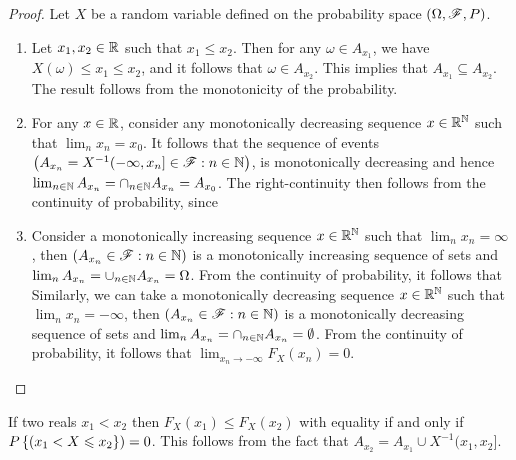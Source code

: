 \documentclass[letterpaper,10pt,english]{article}
\begin{document}
\begin{proof}
Let $X$ be a random variable defined on the probability space $(\Omega, \mathscr{F}, P)$. 
\begin{enumerate}
\item Let $x_1, x_2 \in \mathbb{R}$ such that $x_1 \le x_2$.  
Then for any $\omega \in A_{x_1}$, we have $X(\omega) \le x_1 \le x_2$, and it follows that $\omega \in A_{x_2}$. 
This implies that $A_{x_1} \subseteq A_{x_2}$. 
The result follows from the monotonicity of the probability. 
 
\item For any $x \in \mathbb{R}$, consider any monotonically decreasing sequence $x\in\mathbb{R}^{\mathbb{N}}$ such that $\lim_n x_n = x_0$. 
It follows that the sequence of events $\big(A_{x_n} = X^{-1}(-\infty, x_n] \in \mathscr{F}: n \in \mathbb{N}\big)$, is monotonically decreasing and hence $\lim_{n \in \mathbb{N}}A_{x_n} = \cap_{n \in \mathbb{N}}A_{x_n} = A_{x_0}$. 
The right-continuity then follows from the continuity of probability, since 
\item Consider a monotonically increasing sequence $x\in\mathbb{R}^{\mathbb{N}}$ such that $\lim_{n}x_n = \infty$, then $(A_{x_n} \in \mathscr{F}: n \in \mathbb{N})$ is a monotonically increasing sequence of sets and $\lim_nA_{x_n} = \cup_{n \in \mathbb{N}}A_{x_n} = \Omega$. 
From the continuity of probability, it follows that 
Similarly, we can take a monotonically decreasing sequence $x\in \mathbb{R}^{\mathbb{N}}$ such that $\lim_{n}x_n = -\infty$, 
then $(A_{x_n} \in \mathscr{F}: n \in \mathbb{N})$ is a monotonically decreasing sequence of sets and $\lim_nA_{x_n} = \cap_{n \in \mathbb{N}}A_{x_n} = \emptyset$. 
From the continuity of probability, it follows that $\lim_{x_n \to -\infty}F_X(x_n) = 0$. 
\end{enumerate}
\end{proof}
\begin{rem}
If two reals $x_1 < x_2$ then $F_X(x_1) \le F_X(x_2)$ with equality if and only if $P\left\{(x_1 < X \leqslant x_2\right\}) = 0$. 
This follows from the fact that $A_{x_2} = A_{x_1}\cup X^{-1}(x_1, x_2]$. 
\end{rem}
\end{document}
